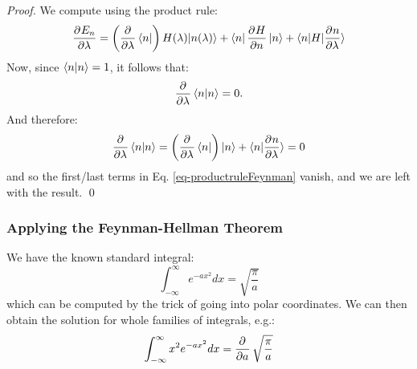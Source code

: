 \textit{Proof.} We compute using the product rule:
\begin{equation}\label{eq-productruleFeynman}
    \begin{split}
        \dpd{E_n}{\lambda} = \left(\dpd{}{\lambda}\bra{n}\right)H(\lambda)\ket{n(\lambda)} + \bra{n}\dpd{H}{n}\ket{n} + \bra{n}H\ket{\dpd{n}{\lambda}}
    \end{split}
\end{equation}
Now, since $\langle n \lvert n \rangle = 1$, it follows that:
\begin{equation}
    \dpd{}{\lambda}\braket{n}{n} = 0.
\end{equation}
And therefore:
\begin{equation}
    \dpd{}{\lambda}\braket{n}{n} = \left(\dpd{}{\lambda}\bra{n}\right)\ket{n} + \braket{n}{\dpd{n}{\lambda}} = 0
\end{equation}
and so the first/last terms in Eq. \eqref{eq-productruleFeynman} vanish, and we are left with the result. \qed

\subsubsection{Applying the Feynman-Hellman Theorem}
We have the known standard integral:
\begin{equation}
    \int_{-\infty}^\infty e^{-ax^2}dx = \sqrt{\frac{\pi}{a}}
\end{equation}
which can be computed by the trick of going into polar coordinates. We can then obtain the solution for whole families of integrals, e.g.:
\begin{equation}
    \int_{-\infty}^\infty x^2e^{-ax^2}dx = \dpd{}{a}\sqrt{\frac{\pi}{a}}
\end{equation}

